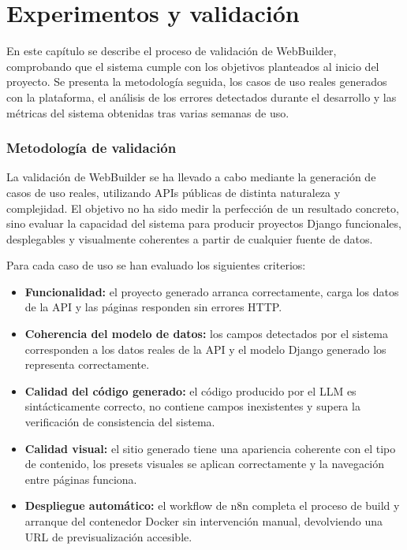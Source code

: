 
\cleardoublepage
\chapter{Experimentos y validación}
\label{chap:experimentos}

En este capítulo se describe el proceso de validación de WebBuilder, comprobando que el sistema cumple con los objetivos planteados al inicio del proyecto. Se presenta la metodología seguida, los casos de uso reales generados con la plataforma, el análisis de los errores detectados durante el desarrollo y las métricas del sistema obtenidas tras varias semanas de uso.

\subsection{Metodología de validación}
\label{subsec:metodologia-validacion}

La validación de WebBuilder se ha llevado a cabo mediante la generación de casos de uso reales, utilizando APIs públicas de distinta naturaleza y complejidad. El objetivo no ha sido medir la perfección de un resultado concreto, sino evaluar la capacidad del sistema para producir proyectos Django funcionales, desplegables y visualmente coherentes a partir de cualquier fuente de datos.

Para cada caso de uso se han evaluado los siguientes criterios:

\begin{itemize}
	\item \textbf{Funcionalidad:} el proyecto generado arranca correctamente, carga los datos de la API y las páginas responden sin errores HTTP.
	
	\item \textbf{Coherencia del modelo de datos:} los campos detectados por el sistema corresponden a los datos reales de la API y el modelo Django generado los representa correctamente.
	
	\item \textbf{Calidad del código generado:} el código producido por el LLM es sintácticamente correcto, no contiene campos inexistentes y supera la verificación de consistencia del sistema.
	
	\item \textbf{Calidad visual:} el sitio generado tiene una apariencia coherente con el tipo de contenido, los presets visuales se aplican correctamente y la navegación entre páginas funciona.
	
	\item \textbf{Despliegue automático:} el workflow de n8n completa el proceso de build y arranque del contenedor Docker sin intervención manual, devolviendo una URL de previsualización accesible.
\end{itemize}

